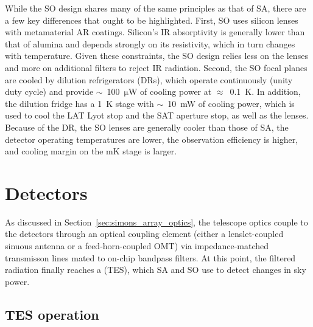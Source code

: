 While the SO design shares many of the same principles as that of SA, there are a few key differences that ought to be highlighted. First, SO uses silicon lenses with metamaterial AR coatings. Silicon's IR absorptivity is generally lower than that of alumina and depends strongly on its resistivity, which in turn changes with temperature. Given these constraints, the SO design relies less on the lenses and more on additional filters to reject IR radiation. Second, the SO focal planes are cooled by dilution refrigerators (DRs), which operate continuously (unity duty cycle) and provide $\sim$~100~$\mathrm{\mu W}$ of cooling power at $\approx$~0.1~K. In addition, the dilution fridge has a 1~K stage with $\sim$~10~mW of cooling power, which is used to cool the LAT Lyot stop and the SAT aperture stop, as well as the lenses. Because of the DR, the SO lenses are generally cooler than those of SA, the detector operating temperatures are lower, the observation efficiency is higher, and cooling margin on the mK stage is larger.


\section{Detectors}
\label{sec:simons_array_detectors}

As discussed in Section~\ref{sec:simons_array_optics}, the telescope optics couple to the detectors through an optical coupling element (either a lenslet-coupled sinuous antenna or a feed-horn-coupled OMT) via impedance-matched transmisson lines mated to on-chip bandpass filters. At this point, the filtered radiation finally reaches a  (TES), which SA and SO use to detect changes in sky power. 


\subsection{TES operation}
\label{sec:tes_operation}


